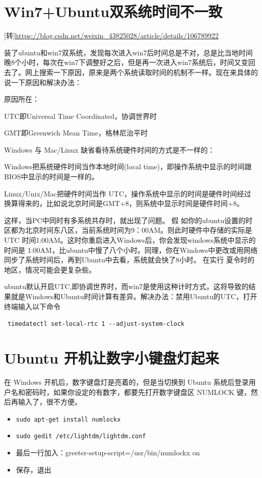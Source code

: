 {\section{Win7+Ubuntu双系统时间不一致}
 [转]\url{https://blog.csdn.net/weixin_43825028/article/details/106789922}

装了ubuntu和win7双系统，发现每次进入win7后时间总是不对，总是比当地时间晚8个小时，每次在win7下调整好之后，但是再一次进入win7系统后，时间又变回去了。网上搜索一下原因，原来是两个系统读取时间的机制不一样。现在来具体的说一下原因和解决办法：

 原因所在：

UTC即Universal Time Coordinated，协调世界时

GMT即Greenwich Mean Time，格林尼治平时

Windows 与 Mac/Linux 缺省看待系统硬件时间的方式是不一样的：

Windows把系统硬件时间当作本地时间(local time)，即操作系统中显示的时间跟BIOS中显示的时间是一样的。

Linux/Unix/Mac把硬件时间当作 UTC，操作系统中显示的时间是硬件时间经过换算得来的，比如说北京时间是GMT+8，则系统中显示时间是硬件时间+8。

这样，当PC中同时有多系统共存时，就出现了问题。
假 如你的ubuntu设置的时区都为北京时间东八区，当前系统时间为9：00AM。则此时硬件中存储的实际是UTC 时间1:00AM。这时你重启进入Windows后，你会发现windows系统中显示的时间是 1:00AM，比ubuntu中慢了八个小时。同理，你在Windows中更改或用网络同步了系统时间后，再到Ubuntu中去看，系统就会快了8小时。 在实行 夏令时的地区，情况可能会更复杂些。


ubuntu默认开启UTC,即协调世界时，而win7是使用这种计时方式，这将导致的结果就是Windows和Ubuntu时间计算有差异。解决办法：禁用Ubuntu的UTC，打开终端输入以下命令

\verb| timedatectl set-local-rtc 1 --adjust-system-clock |


\section{Ubuntu 开机让数字小键盘灯起来  }
在 Windows 开机后，数字键盘灯是亮着的，但是当切换到 Ubuntu 系统后登录用户名和密码时，如果你设定的有数字，都要先打开数字键盘区 NUMLOCK 键，然后再输入了，很不方便。
\begin{itemize}
\item \verb*|sudo apt-get install numlockx|
\item \verb*|sudo gedit /etc/lightdm/lightdm.conf|
\item 最后一行加入：greeter-setup-script=/usr/bin/numlockx on
\item 保存，退出
\end{itemize}


}
